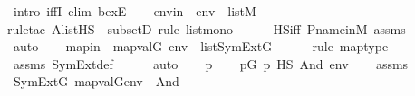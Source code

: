 \begin{isabellebody}
%
\endisadelimproof
%
\isatagproof
{}\isamarkupfalse%
\ {\isacharparenleft}{\kern0pt}intro\ iffI{\isacharcomma}{\kern0pt}\ elim\ bexE{\isacharparenright}{\kern0pt}\isanewline
\ \ \isamarkupfalse%
\ envin\ {\isacharcolon}{\kern0pt}\ {\isachardoublequoteopen}env\ {\isasymin}\ list{\isacharparenleft}{\kern0pt}M{\isacharparenright}{\kern0pt}{\isachardoublequoteclose}\ \isanewline
\ \ \ \ \isamarkupfalse%
{\isacharparenleft}{\kern0pt}rule{\isacharunderscore}{\kern0pt}tac\ A{\isacharequal}{\kern0pt}{\isachardoublequoteopen}list{\isacharparenleft}{\kern0pt}HS{\isacharparenright}{\kern0pt}{\isachardoublequoteclose}\ \ subsetD{\isacharcomma}{\kern0pt}\ rule\ list{\isacharunderscore}{\kern0pt}mono{\isacharparenright}{\kern0pt}\isanewline
\ \ \ \ \isamarkupfalse%
\ HS{\isacharunderscore}{\kern0pt}iff\ P{\isacharunderscore}{\kern0pt}name{\isacharunderscore}{\kern0pt}in{\isacharunderscore}{\kern0pt}M\ assms\isanewline
\ \ \ \ \isamarkupfalse%
\ auto\isanewline
\ \ \isamarkupfalse%
\ mapin\ {\isacharcolon}{\kern0pt}\ {\isachardoublequoteopen}map{\isacharparenleft}{\kern0pt}val{\isacharparenleft}{\kern0pt}G{\isacharparenright}{\kern0pt}{\isacharcomma}{\kern0pt}\ env{\isacharparenright}{\kern0pt}\ {\isasymin}\ list{\isacharparenleft}{\kern0pt}SymExt{\isacharparenleft}{\kern0pt}G{\isacharparenright}{\kern0pt}{\isacharparenright}{\kern0pt}{\isachardoublequoteclose}\ \isanewline
\ \ \ \ \isamarkupfalse%
{\isacharparenleft}{\kern0pt}rule\ map{\isacharunderscore}{\kern0pt}type{\isacharparenright}{\kern0pt}\isanewline
\ \ \ \ \isamarkupfalse%
\ assms\ SymExt{\isacharunderscore}{\kern0pt}def\isanewline
\ \ \ \ \isamarkupfalse%
\ auto\isanewline
\isanewline
\ \ \isamarkupfalse%
\ p\isanewline
\ \ \isamarkupfalse%
\ {\isachardoublequoteopen}p{\isasymin}G{\isachardoublequoteclose}\ {\isachardoublequoteopen}p\ {\isasymtturnstile}HS\ And{\isacharparenleft}{\kern0pt}{\isasymphi}{\isacharcomma}{\kern0pt}{\isasympsi}{\isacharparenright}{\kern0pt}\ env{\isachardoublequoteclose}\isanewline
\ \ \isamarkupfalse%
\ assms\isanewline
\ \ \isamarkupfalse%
\ {\isachardoublequoteopen}SymExt{\isacharparenleft}{\kern0pt}G{\isacharparenright}{\kern0pt}{\isacharcomma}{\kern0pt}\ map{\isacharparenleft}{\kern0pt}val{\isacharparenleft}{\kern0pt}G{\isacharparenright}{\kern0pt}{\isacharcomma}{\kern0pt}env{\isacharparenright}{\kern0pt}\ {\isasymTurnstile}\ And{\isacharparenleft}{\kern0pt}{\isasymphi}{\isacharcomma}{\kern0pt}{\isasympsi}{\isacharparenright}{\kern0pt}{\isachardoublequoteclose}\ \isanewline

\end{isabellebody}
